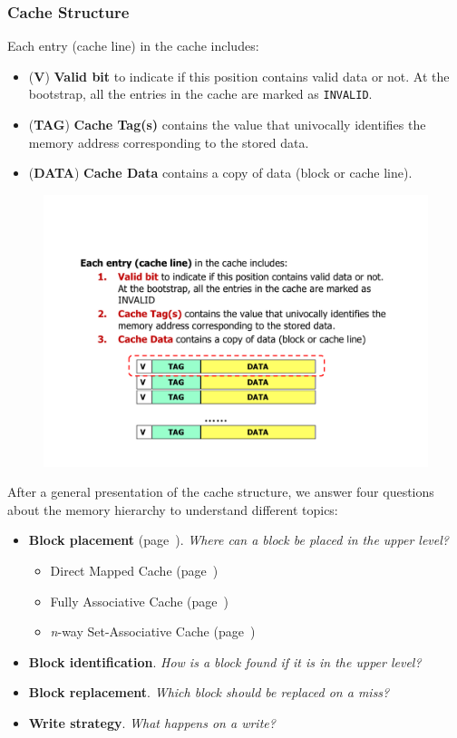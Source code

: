 \subsubsection{Cache Structure}

Each entry (cache line) in the cache includes:
\begin{itemize}
    \item (\textbf{V}) \textbf{Valid bit} to indicate if this position contains valid data or not. At the bootstrap, all the entries in the cache are marked as \texttt{INVALID}.

    \item (\textbf{TAG}) \textbf{Cache Tag(s)} contains the value that univocally identifies the memory address corresponding to the stored data.

    \item (\textbf{DATA}) \textbf{Cache Data} contains a copy of data (block or cache line).
\end{itemize}
\begin{figure}[!htp]
    \centering
    \includegraphics[width=.7\textwidth]{img/cache-structure-1.pdf}
\end{figure}

\noindent
After a general presentation of the cache structure, we answer four questions about the memory hierarchy to understand different topics: 
\begin{itemize}
    \item \textbf{Block placement} (page~\pageref{Block placement}). \emph{Where can a block be placed in the upper level?}
    \begin{itemize}
        \item Direct Mapped Cache (page~\pageref{Direct Mapped Cache})
        \item Fully Associative Cache (page~\pageref{Fully Associative Cache})
        \item \emph{n}-way Set-Associative Cache (page~\pageref{n-way Set-Associative Cache})
    \end{itemize}
    
    \item \textbf{Block identification}. \emph{How is a block found if it is in the upper level?}
    
    \item \textbf{Block replacement}. \emph{Which block should be replaced on a miss?}
    
    \item \textbf{Write strategy}. \emph{What happens on a write?}
\end{itemize}

